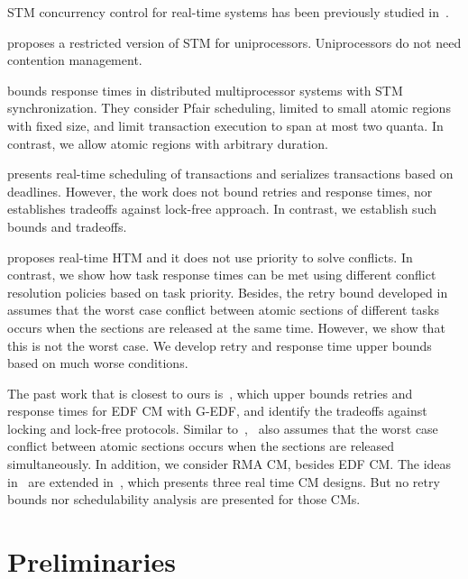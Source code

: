 \documentclass{sig-alternate}
\begin{document}
STM concurrency control for real-time systems has been previously studied in~\cite{manson2006preemptible,fahmy2009bounding,sarni2009real,schoeberl2010rttm,key-1,barrosmanaging}.


\cite{manson2006preemptible} proposes a restricted version of STM for uniprocessors. Uniprocessors do not need contention management.

\cite{fahmy2009bounding} bounds response times in distributed multiprocessor systems with STM synchronization. They consider Pfair scheduling, limited to small atomic regions with fixed size, and limit transaction execution to span at most two quanta. In contrast, we allow atomic regions with  arbitrary duration. 

\cite{sarni2009real} presents real-time scheduling of transactions and serializes transactions based on deadlines. However, the work does not bound retries and response times, nor establishes  tradeoffs against lock-free approach. In contrast, we establish such bounds and tradeoffs.


\cite{schoeberl2010rttm} proposes real-time HTM and it does not use priority to solve conflicts. 
In contrast, we show how task response times can be met using different conflict resolution policies based on task priority. Besides, the retry bound developed in~\cite{schoeberl2010rttm} assumes that the worst case conflict between atomic sections of different tasks occurs when the sections are released at the same time. However, we show that this is not the worst case. We develop retry and response time upper bounds based on much worse conditions.


The past work that is closest to ours is~\cite{key-1}, which upper bounds retries and response times for  EDF CM with G-EDF, and identify the tradeoffs against locking and lock-free protocols. Similar to~\cite{schoeberl2010rttm},~\cite{key-1} also assumes that the worst case conflict between atomic sections occurs when the sections are released simultaneously. 
In addition, we consider RMA CM, besides EDF CM. The ideas in~\cite{key-1} are extended in~\cite{barrosmanaging}, which presents three real time CM designs. But no retry bounds nor schedulability analysis are presented for those CMs. 


\section{Preliminaries}
\label{sec:model}
\end{document}
